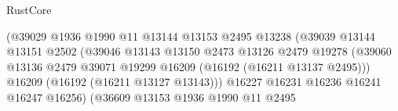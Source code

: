 \begin{lexlean}{RustCore}
\begin{coremodule}
                                                      (@39029
                                                        @1936
                                                        @1990
                                                        @11
                                                        @13144
                                                        @13153
                                                        @2495
                                                        @13238
                                                        (@39039
                                                          @13144
                                                          @13151
                                                          @2502
                                                          (@39046
                                                            @13143
                                                            @13150
                                                            @2473
                                                            @13126
                                                            @2479
                                                            @19278
                                                            (@39060
                                                              @13136
                                                              @2479
                                                              @39071
                                                              @19299
                                                              @16209
                                                              (@16192 (@16211 @13137 @2495)))
                                                            @16209
                                                            (@16192 (@16211 @13127 @13143)))
                                                          @16227
                                                          @16231
                                                          @16236
                                                          @16241
                                                          @16247
                                                          @16256)
                                                        (@36609
                                                          @13153
                                                          @1936
                                                          @1990
                                                          @11
                                                          @2495

\end{coremodule}
\end{lexlean}
